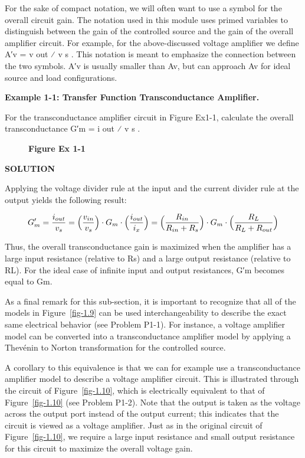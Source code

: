 \documentclass[
  11pt,
  letterpaper,
  abstract]{scrbook}
\begin{document}
For the sake of compact notation, we will often want to use a symbol for
the overall circuit gain. The notation used in this module uses primed
variables to distinguish between the gain of the controlled source and
the gain of the overall amplifier circuit. For example, for the
above-discussed voltage amplifier we define A′v = v out ⁄ v s . This
notation is meant to emphasize the connection between the two symbols.
A′v is usually smaller than Av, but can approach Av for ideal source and
load configurations.

\textbf{Example 1-1: Transfer Function Transconductance Amplifier.}

For the transconductance amplifier circuit in Figure Ex1-1, calculate
the overall transconductance G′m = i out ⁄ v s .

\begin{figure}


\caption{\label{fig-ex-1.1}\textbf{Figure Ex 1-1}}

\end{figure}%

\textbf{SOLUTION}

Applying the voltage divider rule at the input and the current divider
rule at the output yields the following result:

\[
G'_m = \frac{i_{out}}{v_s} = \Bigl(\frac{v_{in}}{v_s}\Bigr) \cdot G_m \cdot \Bigl(\frac{i_{out}}{i_x}\Bigr) =  \Bigl(\frac{R_{in}}{R_{in} + R_s}\Bigr) \cdot G_m \cdot \Bigl(\frac{R_{L}}{R_{L} + R_{out}}\Bigr)
\]

Thus, the overall transconductance gain is maximized when the amplifier
has a large input resistance (relative to Rs) and a large output
resistance (relative to RL). For the ideal case of infinite input and
output resistances, G′m becomes equal to Gm.

As a final remark for this sub-section, it is important to recognize
that all of the models in Figure~\ref{fig-1.9} can be used
interchangeability to describe the exact same electrical behavior (see
Problem P1-1). For instance, a voltage amplifier model can be converted
into a transconductance amplifier model by applying a Thevénin to Norton
transformation for the controlled source.

A corollary to this equivalence is that we can for example use a
transconductance amplifier model to describe a voltage amplifier
circuit. This is illustrated through the circuit of
Figure~\ref{fig-1.10}, which is electrically equivalent to that of
Figure~\ref{fig-1.10} (see Problem P1-2). Note that the output is taken
as the voltage across the output port instead of the output current;
this indicates that the circuit is viewed as a voltage amplifier. Just
as in the original circuit of Figure~\ref{fig-1.10}, we require a large
input resistance and small output resistance for this circuit to
maximize the overall voltage gain.
\end{document}
